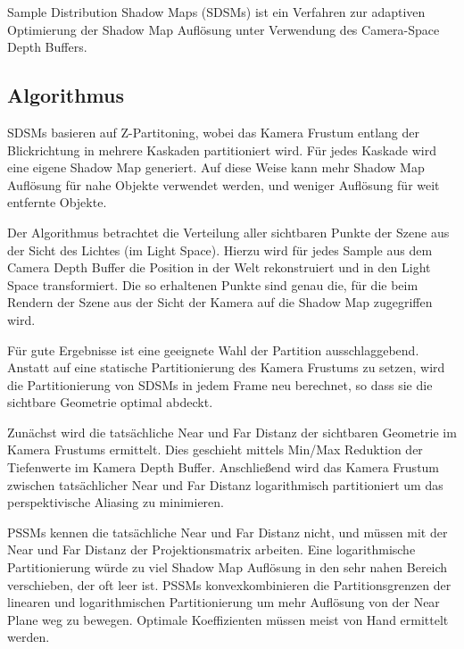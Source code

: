 \documentclass[runningheaders,a4paper]{llncs}
\begin{document}
Sample Distribution Shadow Maps (SDSMs) ist ein Verfahren zur adaptiven Optimierung der Shadow Map Auflösung unter Verwendung des Camera-Space Depth Buffers.

\subsection{Algorithmus}

SDSMs basieren auf Z-Partitoning, wobei das Kamera Frustum entlang der Blickrichtung in mehrere Kaskaden partitioniert wird. Für jedes Kaskade wird eine eigene Shadow Map generiert.
Auf diese Weise kann mehr Shadow Map Auflösung für nahe Objekte verwendet werden, und weniger Auflösung für weit entfernte Objekte.


Der Algorithmus betrachtet die Verteilung aller sichtbaren Punkte der Szene aus der Sicht des Lichtes (im Light Space).
Hierzu wird für jedes Sample aus dem Camera Depth Buffer die Position in der Welt rekonstruiert und in den Light Space transformiert.
Die so erhaltenen Punkte sind genau die, für die beim Rendern der Szene aus der Sicht der Kamera auf die Shadow Map zugegriffen wird.


Für gute Ergebnisse ist eine geeignete Wahl der Partition ausschlaggebend.
Anstatt auf eine statische Partitionierung des Kamera Frustums \cite{pssm} zu setzen, wird die Partitionierung von SDSMs in jedem Frame neu berechnet, so dass sie die sichtbare Geometrie optimal abdeckt.

Zunächst wird die tatsächliche Near und Far Distanz der sichtbaren Geometrie im Kamera Frustums ermittelt.
Dies geschieht mittels Min/Max Reduktion der Tiefenwerte im Kamera Depth Buffer.
Anschließend wird das Kamera Frustum zwischen tatsächlicher Near und Far Distanz logarithmisch partitioniert um das perspektivische Aliasing zu minimieren.

PSSMs kennen die tatsächliche Near und Far Distanz nicht, und müssen mit der Near und Far Distanz der Projektionsmatrix arbeiten.
Eine logarithmische Partitionierung würde zu viel Shadow Map Auflösung in den sehr nahen Bereich verschieben, der oft leer ist.
PSSMs konvexkombinieren die Partitionsgrenzen der linearen und logarithmischen Partitionierung um mehr Auflösung von der Near Plane weg zu bewegen.
Optimale Koeffizienten müssen meist von Hand ermittelt werden.
\end{document}
